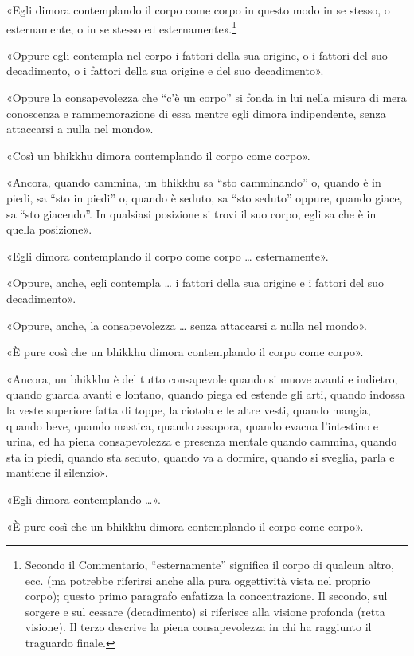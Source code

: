 «Egli dimora contemplando il corpo come corpo in questo modo in se stesso, o
esternamente, o in se stesso ed esternamente».\footnote{Secondo il Commentario,
  “esternamente” significa il corpo di qualcun altro, ecc. (ma potrebbe
  riferirsi anche alla pura oggettività vista nel proprio corpo); questo primo
  paragrafo enfatizza la concentrazione. Il secondo, sul sorgere e sul cessare
  (decadimento) si riferisce alla visione profonda (retta visione). Il terzo
  descrive la piena consapevolezza in chi ha raggiunto il traguardo finale.}

«Oppure egli contempla nel corpo i fattori della sua origine, o i fattori del
suo decadimento, o i fattori della sua origine e del suo decadimento».

«Oppure la consapevolezza che “c’è un corpo” si fonda in lui nella misura di
mera conoscenza e rammemorazione di essa mentre egli dimora indipendente, senza
attaccarsi a nulla nel mondo».

«Così un bhikkhu dimora contemplando il corpo come corpo».

«Ancora, quando cammina, un bhikkhu sa “sto camminando” o, quando è in piedi, sa
“sto in piedi” o, quando è seduto, sa “sto seduto” oppure, quando giace, sa “sto
giacendo”. In qualsiasi posizione si trovi il suo corpo, egli sa che è in quella
posizione».

«Egli dimora contemplando il corpo come corpo … esternamente».

«Oppure, anche, egli contempla … i fattori della sua origine e i fattori del suo
decadimento».

«Oppure, anche, la consapevolezza … senza attaccarsi a nulla nel mondo».

«È pure così che un bhikkhu dimora contemplando il corpo come corpo».

«Ancora, un bhikkhu è del tutto consapevole quando si muove avanti e indietro,
quando guarda avanti e lontano, quando piega ed estende gli arti, quando indossa
la veste superiore fatta di toppe, la ciotola e le altre vesti, quando mangia,
quando beve, quando mastica, quando assapora, quando evacua l’intestino e urina,
ed ha piena consapevolezza e presenza mentale quando cammina, quando sta in
piedi, quando sta seduto, quando va a dormire, quando si sveglia, parla e
mantiene il silenzio».

«Egli dimora contemplando …».

«È pure così che un bhikkhu dimora contemplando il corpo come corpo».


